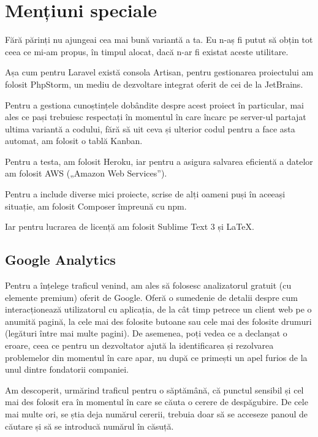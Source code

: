\section{Mențiuni speciale}

	Fără părinți nu ajungeai cea mai bună variantă a ta.
	Eu n-aș fi putut să obțin tot ceea ce mi-am propus, în timpul alocat, dacă n-ar fi existat aceste utilitare.

	Așa cum pentru Laravel există consola Artisan, pentru gestionarea proiectului am folosit PhpStorm, un mediu de dezvoltare integrat oferit de cei de la JetBrains.

	Pentru a gestiona cunoștințele dobândite despre acest proiect în particular, mai ales ce pași trebuiesc respectați în momentul în care încarc pe server-ul partajat ultima variantă a codului, fără să uit ceva și ulterior codul pentru a face asta automat, am folosit o tablă Kanban.

	Pentru a testa, am folosit Heroku, iar pentru a asigura salvarea eficientă a datelor am folosit AWS („Amazon Web Services”).

	Pentru a include diverse mici proiecte, scrise de alți oameni puși în aceeași situație, am folosit Composer împreună cu npm.

	Iar pentru lucrarea de licență am folosit Sublime Text 3 și \LaTeX .

	\subsection{Google Analytics}

	Pentru a înțelege traficul venind, am ales să folosesc analizatorul gratuit (cu elemente premium) oferit de Google.
	Oferă o sumedenie de detalii despre cum interacționează utilizatorul cu aplicația, de la cât timp petrece un client web pe o anumită pagină, la cele mai des folosite butoane sau cele mai des folosite drumuri (legături între mai multe pagini). \cite{google_analytics}
	De asemenea, poți vedea ce a declanșat o eroare, ceea ce pentru un dezvoltator ajută la identificarea și rezolvarea problemelor din momentul în care apar, nu după ce primești un apel furios de la unul dintre fondatorii companiei.

	Am descoperit, urmărind traficul pentru o săptămână, că punctul sensibil și cel mai des folosit era în momentul în care se căuta o cerere de despăgubire.
	De cele mai multe ori, se știa deja numărul cererii, trebuia doar să se acceseze panoul de căutare și să se introducă numărul în căsuță.

